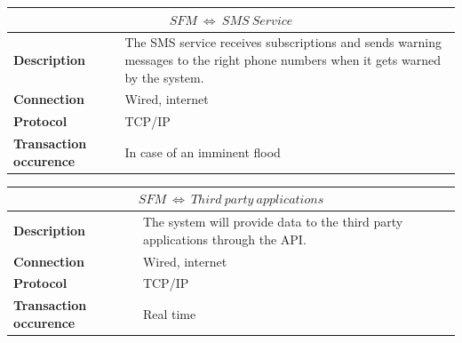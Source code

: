 
\begin{table}[H]
	\centering
	\begin{tabular}{L{} L{}}
		\toprule
		 \\ \midrule
		\textbf{Description}           & The SMS service receives subscriptions and sends warning messages to the right phone numbers when it gets warned by the system. \\
		\textbf{Connection}            & Wired, internet                                                                                                                 \\
		\textbf{Protocol}              & TCP/IP                                                                                                                          \\
		\textbf{Transaction occurence} & In case of an imminent flood                                                                                                    \\
		\bottomrule
	\end{tabular}
\end{table}

\begin{table}[H]
	\centering
	\begin{tabular}{L{} L{}}
		\toprule
		 \\ \midrule
		\textbf{Description}           & The system will provide data to the third party applications through the API. \\
		\textbf{Connection}            & Wired, internet                                                               \\
		\textbf{Protocol}              & TCP/IP                                                                        \\
		\textbf{Transaction occurence} & Real time                                                                     \\
		\bottomrule
	\end{tabular}
\end{table}

